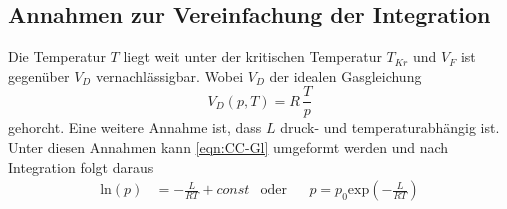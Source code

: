 
\subsection{Annahmen zur Vereinfachung der Integration} %
\label{sub:Vereinfachung}
Die Temperatur $T$ liegt weit unter der kritischen Temperatur $T_{Kr}$ und $V_F$ ist gegenüber $V_D$ vernachlässigbar.
Wobei $V_D$ der idealen Gasgleichung
\begin{equation*}
    V_D(p,T) = R\,\frac{T}{p}
\end{equation*}
gehorcht.
Eine weitere Annahme ist, dass $L$ druck- und temperaturabhängig ist. 
Unter diesen Annahmen kann \autoref{eqn:CC-Gl} umgeformt werden und nach Integration folgt daraus
\begin{align}
    \text{ln}(p) &= -\frac{L}{RT}+const &\text{oder} && p=p_0 \text{exp}(-\frac{L}{RT})
    \label{eqn:CC-Gl_2}
\end{align}
 